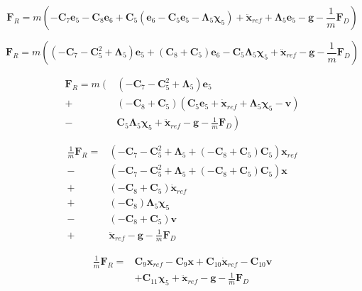 \[
\mathbf{F}_{R}
= m \left(
	-\mathbf{C}_7 \mathbf{e}_5 - \mathbf{C}_8 \mathbf{e}_6
	+ \mathbf{C}_5 \left( \mathbf{e}_6 - \mathbf{C}_5 \mathbf{e}_5 - \boldsymbol\Lambda_5 \boldsymbol\chi_5 \right)
	+ \ddot{\mathbf{x}}_{ref}
	+ \boldsymbol\Lambda_5 \mathbf{e}_5
	- \mathbf{g}
	- \frac{1}{m} \mathbf{F}_{D}
\right)
\]

\[
\mathbf{F}_{R}
= m \left(
	\left( -\mathbf{C}_7 - \mathbf{C}_5^2 + \boldsymbol\Lambda_5\right) \mathbf{e}_5 +
	\left( \mathbf{C}_8 + \mathbf{C}_5 \right) \mathbf{e}_6 
	- \mathbf{C}_5 \boldsymbol\Lambda_5 \boldsymbol\chi_5
	+ \ddot{\mathbf{x}}_{ref}
	- \mathbf{g}
	- \frac{1}{m} \mathbf{F}_{D}
\right)
\]

\begin{align}\nonumber
\mathbf{F}_{R}
= m \left( \right. & \left( -\mathbf{C}_7 - \mathbf{C}_5^2 + \boldsymbol\Lambda_5 \right) \mathbf{e}_5 \\\nonumber
	+ &\left( -\mathbf{C}_8 + \mathbf{C}_5 \right) \left( \mathbf{C}_5 \mathbf{e}_5 + \dot{\mathbf{x}}_{ref} + \boldsymbol\Lambda_5 \boldsymbol\chi_5 - \mathbf{v}\right) \\\nonumber
	- &\left. \mathbf{C}_5 \boldsymbol\Lambda_5 \boldsymbol\chi_5
	+ \ddot{\mathbf{x}}_{ref}
	- \mathbf{g}
	- \frac{1}{m} \mathbf{F}_{D}
\right)
\end{align}

\begin{align}\nonumber
\frac{1}{m} \mathbf{F}_{R}
= & \left( -\mathbf{C}_7 - \mathbf{C}_5^2 + \boldsymbol\Lambda_5 + \left( -\mathbf{C}_8 + \mathbf{C}_5 \right) \mathbf{C}_5 \right) \mathbf{x}_{ref} \\\nonumber
- &\left( -\mathbf{C}_7 - \mathbf{C}_5^2 + \boldsymbol\Lambda_5 + \left( -\mathbf{C}_8 + \mathbf{C}_5 \right) \mathbf{C}_5 \right) \mathbf{x} \\\nonumber
+ &\left( -\mathbf{C}_8 + \mathbf{C}_5 \right) \dot{\mathbf{x}}_{ref} \\\nonumber
+ &\left( -\mathbf{C}_8 \right) \boldsymbol\Lambda_5 \boldsymbol\chi_5 \\\nonumber
- &\left( -\mathbf{C}_8 + \mathbf{C}_5 \right) \mathbf{v} \\\nonumber
+ &\ddot{\mathbf{x}}_{ref} - \mathbf{g} - \frac{1}{m} \mathbf{F}_{D}
\end{align}

\begin{align}\nonumber
\frac{1}{m} \mathbf{F}_{R}
= & \mathbf{C}_9 \mathbf{x}_{ref} - \mathbf{C}_9 \mathbf{x} + \mathbf{C}_{10} \dot{\mathbf{x}}_{ref} - \mathbf{C}_{10} \mathbf{v} \\\nonumber
& + \mathbf{C}_{11} \boldsymbol\chi_5 + \ddot{\mathbf{x}}_{ref} - \mathbf{g} - \frac{1}{m} \mathbf{F}_{D}
\end{align}

